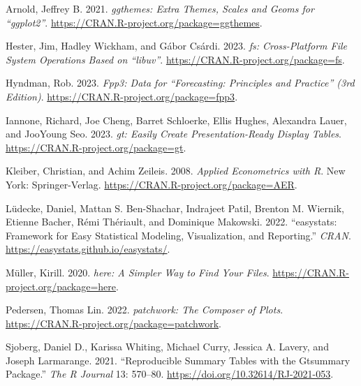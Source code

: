 \documentclass[
  letterpaper,
  paper =a4,
  twoside,
  openright,
  headsepline,
  footsepline,
  listof = totocnumbered,
  chapterprefix = true,
  firstiscover]{scrbook}
\newlength{\cslhangindent}
\newlength{\cslentryspacingunit} %
\newenvironment{CSLReferences}[2] %
 {%
  \setlength{\parindent}{0pt}
  \ifodd #1
  \let\oldpar\par
  \def\par{\hangindent=\cslhangindent\oldpar}
  \fi
  \setlength{\parskip}{#2\cslentryspacingunit}
 }%
 {}
\begin{document}

\thispagestyle{plain}

\hypertarget{refs}{}
\begin{CSLReferences}{1}{0}
\leavevmode{}%
Arnold, Jeffrey B. 2021. \emph{{ggthemes}: Extra Themes, Scales and
Geoms for {``{ggplot2}''}}.
\url{https://CRAN.R-project.org/package=ggthemes}.

\leavevmode{}%
Hester, Jim, Hadley Wickham, and Gábor Csárdi. 2023. \emph{{fs}:
Cross-Platform File System Operations Based on {``{libuv}''}}.
\url{https://CRAN.R-project.org/package=fs}.

\leavevmode{}%
Hyndman, Rob. 2023. \emph{Fpp3: Data for {``{Forecasting: Principles and
Practice}''} (3rd Edition)}.
\url{https://CRAN.R-project.org/package=fpp3}.

\leavevmode{}%
Iannone, Richard, Joe Cheng, Barret Schloerke, Ellis Hughes, Alexandra
Lauer, and JooYoung Seo. 2023. \emph{{gt}: Easily Create
Presentation-Ready Display Tables}.
\url{https://CRAN.R-project.org/package=gt}.

\leavevmode{}%
Kleiber, Christian, and Achim Zeileis. 2008. \emph{Applied Econometrics
with {R}}. New York: Springer-Verlag.
\url{https://CRAN.R-project.org/package=AER}.

\leavevmode{}%
Lüdecke, Daniel, Mattan S. Ben-Shachar, Indrajeet Patil, Brenton M.
Wiernik, Etienne Bacher, Rémi Thériault, and Dominique Makowski. 2022.
{``{easystats}: Framework for Easy Statistical Modeling, Visualization,
and Reporting.''} \emph{CRAN}.
\url{https://easystats.github.io/easystats/}.

\leavevmode{}%
Müller, Kirill. 2020. \emph{{here}: A Simpler Way to Find Your Files}.
\url{https://CRAN.R-project.org/package=here}.

\leavevmode{}%
Pedersen, Thomas Lin. 2022. \emph{{patchwork}: The Composer of Plots}.
\url{https://CRAN.R-project.org/package=patchwork}.

\leavevmode{}%
Sjoberg, Daniel D., Karissa Whiting, Michael Curry, Jessica A. Lavery,
and Joseph Larmarange. 2021. {``Reproducible Summary Tables with the
Gtsummary Package.''} \emph{{The R Journal}} 13: 570--80.
\url{https://doi.org/10.32614/RJ-2021-053}.


\end{CSLReferences}
\end{document}
